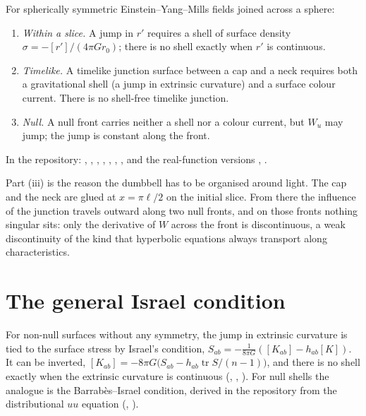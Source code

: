 \begin{theorem}\proved\label{thm:junctions}
For spherically symmetric Einstein--Yang--Mills fields joined across a sphere:
\begin{enumerate}[label=(\roman*)]
\item \emph{Within a slice.} A jump in $r'$ requires a shell of surface density $\sigma=-[r']/(4\pi Gr_0)$; there is no shell exactly when $r'$ is continuous.
\item \emph{Timelike.} A timelike junction surface between a cap and a neck requires both a gravitational shell (a jump in extrinsic curvature) and a surface colour current. There is no shell-free timelike junction.
\item \emph{Null.} A null front carries neither a shell nor a colour current, but $W_u$ may jump; the jump is constant along the front.
\end{enumerate}
\end{theorem}
\noindent In the repository: , , , , , , , and the real-function versions , .

Part (iii) is the reason the dumbbell has to be organised around light. The cap and the neck are glued at $x=\pi\ell/2$ on the initial slice. From there the influence of the junction travels outward along two null fronts, and on those fronts nothing singular sits: only the derivative of $W$ across the front is discontinuous, a weak discontinuity of the kind that hyperbolic equations always transport along characteristics.

\section{The general Israel condition}

For non-null surfaces without any symmetry, the jump in extrinsic curvature is tied to the surface stress by Israel's condition, $S_{ab}=-\frac1{8\pi G}([K_{ab}]-h_{ab}[K])$. It can be inverted, $[K_{ab}]=-8\pi G\bigl(S_{ab}-h_{ab}\operatorname{tr}S/(n-1)\bigr)$, and there is no shell exactly when the extrinsic curvature is continuous (, , ). For null shells the analogue is the Barrabès--Israel condition, derived in the repository from the distributional $uu$ equation (, ).

